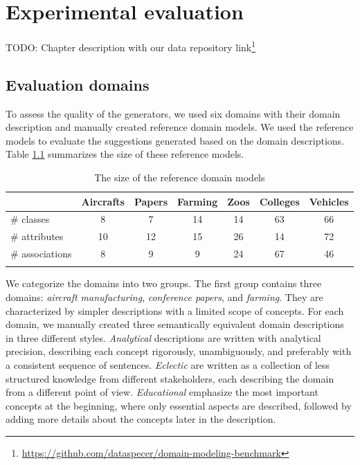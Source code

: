 \chapter{Experimental evaluation}

TODO: Chapter description with our data repository link\footnote{\url{https://github.com/dataspecer/domain-modeling-benchmark}}


\section{Evaluation domains}

To assess the quality of the generators, we used six domains with their domain description and manually created reference domain models.
We used the reference models to evaluate the suggestions generated based on the domain descriptions.
Table \ref{tab:reference-model-size} summarizes the size of these reference models.

\begin{table}[!h]
    \scriptsize
    \centering
    \setlength{\tabcolsep}{0.5em}
    \begin{tabular}{lcccccc}
         & Aircrafts & Papers & Farming & Zoos & Colleges & Vehicles \\
    \toprule
    \addlinespace
         \# classes      & 8  & 7  & 14 & 14 & 63 & 66 \\
         \# attributes   & 10 & 12 & 15 & 26 & 14 & 72 \\
         \# associations & 8  & 9  & 9  & 24 & 67 & 46 \\
    \addlinespace
    \bottomrule
    \addlinespace
    \end{tabular}
    \caption{The size of the reference domain models}
    \label{tab:reference-model-size}
\end{table}


We categorize the domains into two groups.
The first group contains three domains: \emph{aircraft manufacturing}, \emph{conference papers}, and \emph{farming}.
They are characterized by simpler descriptions with a limited scope of concepts.
For each domain, we manually created three semantically equivalent domain descriptions in three different styles.
\emph{Analytical} descriptions are written with analytical precision, describing each concept rigorously, unambiguously, and preferably with a consistent sequence of sentences.
\emph{Eclectic} are written as a collection of less structured knowledge from different stakeholders, each describing the domain from a different point of view.
\emph{Educational} emphasize the most important concepts at the beginning, where only essential aspects are described, followed by adding more details about the concepts later in the description.

